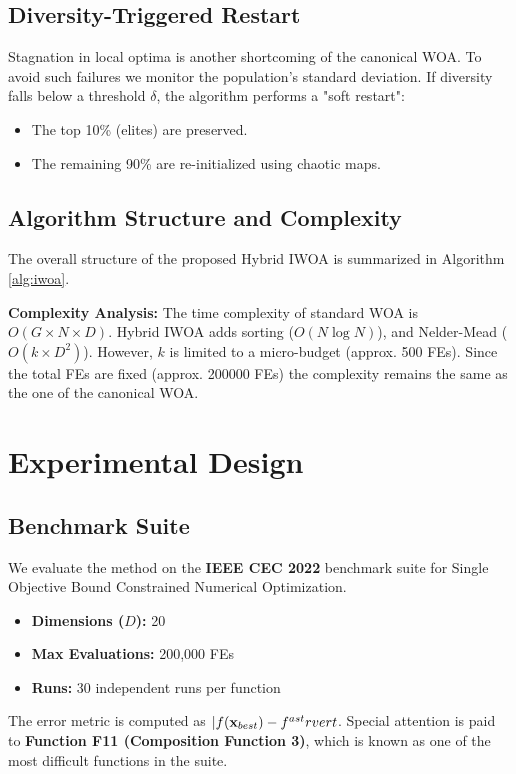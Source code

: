 \documentclass[conference]{IEEEtran}
\begin{document}
\subsection{Diversity-Triggered Restart}
Stagnation in local optima is another shortcoming of the canonical WOA. To avoid such failures we monitor the population's standard deviation. If diversity falls below a threshold $\delta$, the algorithm performs a "soft restart":
\begin{itemize}
    \item The top 10\% (elites) are preserved.
    \item The remaining 90\% are re-initialized using chaotic maps.
\end{itemize}

\subsection{Algorithm Structure and Complexity}
The overall structure of the proposed Hybrid IWOA is summarized in Algorithm \ref{alg:iwoa}.

\textbf{Complexity Analysis:} The time complexity of standard WOA is $O(G \times N \times D)$. Hybrid IWOA adds sorting ($O(N \log N)$), and Nelder-Mead ($O(k \times D^2)$). However, $k$ is limited to a micro-budget (approx. 500 FEs). Since the total FEs are fixed (approx. 200000 FEs) the complexity remains the same as the one of the canonical WOA.

\section{Experimental Design}
\label{sec:experiments}

\subsection{Benchmark Suite}
We evaluate the method on the \textbf{IEEE CEC 2022} benchmark suite for Single Objective Bound Constrained Numerical Optimization.
\begin{itemize}
    \item \textbf{Dimensions ($D$):} 20
    \item \textbf{Max Evaluations:} 200,000 FEs
    \item \textbf{Runs:} 30 independent runs per function
\end{itemize}
The error metric is computed as $\lvert f(\mathbf{x}_{best}) - f^{\\ast}\\rvert$. Special attention is paid to \textbf{Function F11 (Composition Function 3)}, which is known as one of the most difficult functions in the suite.
\end{document}
